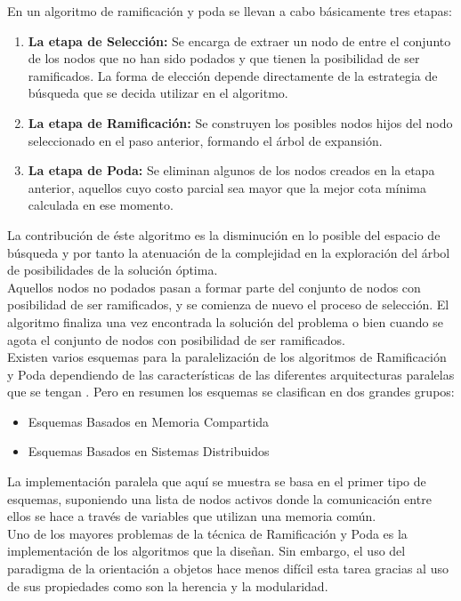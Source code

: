 En un algoritmo de ramificación y poda se llevan a cabo básicamente tres etapas: 
 
\begin{enumerate}
    \item \textbf{ La etapa de Selección:} Se encarga de extraer un nodo de entre el conjunto de los nodos que no han sido podados y que tienen la posibilidad de ser ramificados. La forma de elección depende directamente de la estrategia de búsqueda que se decida utilizar en el algoritmo.
    \item  \textbf{La etapa de Ramificación:} Se construyen los posibles nodos hijos del nodo seleccionado en el paso anterior, formando el árbol de expansión. 
    \item  \textbf{La etapa de Poda:} Se eliminan algunos de los nodos creados en la etapa anterior, 
aquellos cuyo costo parcial sea mayor que la mejor cota mínima calculada en ese 
momento.
\end{enumerate}
 

\hspace*{1cm}La contribución de éste algoritmo es la disminución en lo posible del espacio de búsqueda y por tanto la atenuación de la complejidad en la exploración del árbol de posibilidades de la solución óptima. \\
\hspace*{1cm}Aquellos nodos no podados pasan a formar parte del conjunto de nodos con posibilidad de ser ramificados, y se comienza de nuevo el proceso de selección. El algoritmo finaliza una vez encontrada la solución del problema o bien cuando se agota el conjunto de nodos con posibilidad de ser ramificados.\\
\hspace*{1cm}Existen varios esquemas para la paralelización de los algoritmos de Ramificación y Poda dependiendo de las características de las diferentes arquitecturas paralelas que se tengan \cite{[CAP]}. Pero en resumen los esquemas se clasifican en dos grandes grupos:

\begin{itemize}
    \item  Esquemas Basados en Memoria Compartida 
    \item  Esquemas Basados en Sistemas Distribuidos
\end{itemize}

\hspace*{1cm}La implementación paralela que aquí se muestra se basa en el primer tipo de esquemas, suponiendo una lista de nodos activos donde la comunicación entre ellos se hace a través de variables que utilizan una memoria común.\\
 
\hspace*{1cm}Uno de los mayores problemas de la técnica de Ramificación y Poda es la 
implementación de los algoritmos que la diseñan. Sin embargo, el uso del paradigma de la orientación a objetos hace menos difícil esta tarea gracias al uso de sus propiedades como son la herencia y la modularidad.\\
